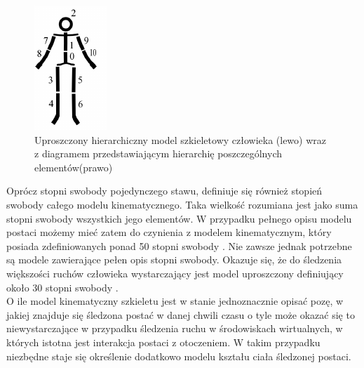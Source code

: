 \begin{figure}[!htb]
	\centering
	\begin{minipage}{.2\textwidth}
		\centering
		\includegraphics{images/hierarchical-structure.png}       
	\end{minipage}%
	\begin{minipage}{0.8\textwidth}
		\centering
		\scalebox{0.8}{
			
		}
	\end{minipage}
	\caption{Uproszczony hierarchiczny model szkieletowy człowieka (lewo) wraz z diagramem przedstawiającym hierarchię poszczególnych elementów(prawo)\cite{Kwolek2014}}
	\label{fig:literature:skeletonModelHierarchy}
\end{figure}

Oprócz stopni swobody pojedynczego stawu, definiuje się również stopień swobody całego modelu kinematycznego. Taka wielkość rozumiana jest jako suma stopni swobody wszystkich jego elementów. W przypadku pełnego opisu modelu postaci możemy mieć zatem do czynienia z modelem kinematycznym, który posiada zdefiniowanych ponad 50 stopni swobody \cite{Agarwal2006}. Nie zawsze jednak potrzebne są modele zawierające pełen opis stopni swobody. Okazuje się, że do śledzenia większości ruchów człowieka wystarczający jest model uproszczony definiujący około 30 stopni swobody \cite{Sigal2006,Kwolek2011}.\\

O ile model kinematyczny szkieletu jest w stanie jednoznacznie opisać pozę, w jakiej znajduje się śledzona postać w danej chwili czasu o tyle może okazać się to niewystarczające w przypadku śledzenia ruchu w środowiskach wirtualnych, w których istotna jest interakcja postaci z otoczeniem. W takim przypadku niezbędne staje się określenie dodatkowo modelu kształu ciała śledzonej postaci.
		
